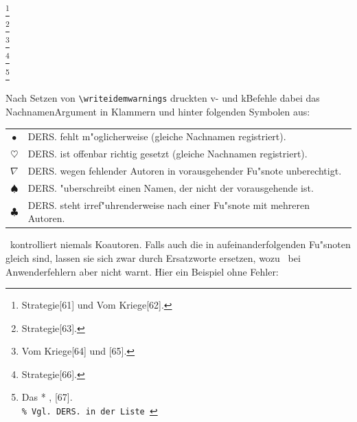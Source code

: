 \documentclass[12pt,a4paper]{article}
\begin{document}
{\writeidemwarnings
 \footnote{ {Strategie}[61] und 
       {Vom Kriege}[62].} 
 \\[8.25ex]
 \footnote{ {Strategie}[63].}
 \\[3ex]
 \footnote{ {Vom Kriege}[64] und 
      [65].}
 \\[8.25ex]
 \footnote{ {Strategie}[66].}
 \\[3ex]
 \footnote{ {Das 
                      
  *{} {, %
        }}[67].
        \\
        \texttt{\% Vgl.\ DERS. in der Liste }
        }
}

\vspace{.5ex}\noindent
Nach Setzen von \verb|\writeidemwarnings| druckten v- und k\fhy Befehle 
dabei das Nachnamen\hy Argument in Klammern und hinter folgenden Symbolen aus:

 \vspace{2ex}\noindent
 {\small\begin{tabular}{cl}%
 $\bullet$    & \textsc{\footnotesize DERS.} \sffamily fehlt m"oglicherweise (gleiche Nachnamen registriert).              \\
 $\heartsuit$ & \textsc{\footnotesize DERS.} \sffamily ist offenbar richtig gesetzt (gleiche Nachnamen registriert).       \\
 $\nabla$     & \textsc{\footnotesize DERS.} \sffamily wegen fehlender Autoren in vorausgehender Fu"snote unberechtigt.    \\
 $\spadesuit$ & \textsc{\footnotesize DERS.} \sffamily "uberschreibt einen Namen, der nicht der vorausgehende ist.          \\
 $\clubsuit$  & \textsc{\footnotesize DERS.} \sffamily steht irref"uhrenderweise nach einer Fu"snote mit mehreren Autoren. \\
 \end{tabular}}

\vspace{2ex}\noindent
\BibArts\ kontrolliert niemals Koautoren. Falls auch die in
aufeinanderfolgenden Fu"snoten gleich sind, lassen sie sich zwar durch 
Ersatzworte ersetzen, wozu \BibArts\ bei Anwenderfehlern aber nicht warnt. 
Hier ein Beispiel ohne Fehler:
\end{document}
